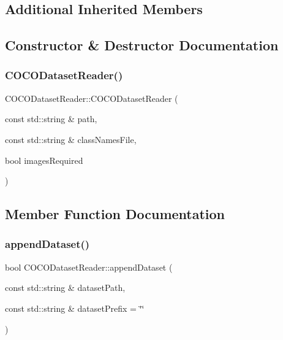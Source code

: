 \subsection*{Additional Inherited Members}


\subsection{Constructor \& Destructor Documentation}
\mbox{\label{class_c_o_c_o_dataset_reader_aeb5609c8496c92013c5e6d551696f3c8}} 
\subsubsection{\texorpdfstring{C\+O\+C\+O\+Dataset\+Reader()}{COCODatasetReader()}}
{\footnotesize\ttfamily C\+O\+C\+O\+Dataset\+Reader\+::\+C\+O\+C\+O\+Dataset\+Reader (\begin{DoxyParamCaption}\item[{const std\+::string \&}]{path,  }\item[{const std\+::string \&}]{class\+Names\+File,  }\item[{bool}]{images\+Required }\end{DoxyParamCaption})}



\subsection{Member Function Documentation}
\mbox{\label{class_c_o_c_o_dataset_reader_a0b7e394c98b512e387952c7f7e39823d}} 
\subsubsection{\texorpdfstring{append\+Dataset()}{appendDataset()}}
{\footnotesize\ttfamily bool C\+O\+C\+O\+Dataset\+Reader\+::append\+Dataset (\begin{DoxyParamCaption}\item[{const std\+::string \&}]{dataset\+Path,  }\item[{const std\+::string \&}]{dataset\+Prefix = {\ttfamily \char`\"{}\char`\"{}} }\end{DoxyParamCaption})\hspace{0.3cm}{\ttfamily [virtual]}}



